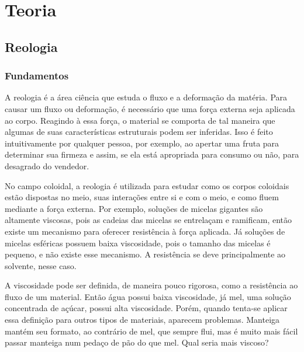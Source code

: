 \part{Teoria}
	\chapter{Reologia}
		\section{Fundamentos}
		
		A reologia é a área ciência que estuda o fluxo e a deformação da matéria. Para causar um fluxo ou deformação, é necessário que uma força externa seja aplicada ao corpo. Reagindo à essa força, o material se comporta de tal maneira que algumas de suas características estruturais podem ser inferidas. Isso é feito intuitivamente por qualquer pessoa, por exemplo, ao apertar uma fruta para determinar sua firmeza e assim, se ela está apropriada para consumo ou não, para desagrado do vendedor.  %
		
		No campo coloidal, a reologia é utilizada para estudar como os corpos coloidais estão dispostas no meio, suas interações entre si e com o meio, e como fluem mediante a força externa. Por exemplo, soluções de micelas gigantes são altamente viscosas, pois as cadeias das micelas se entrelaçam e ramificam, então existe um mecanismo para oferecer resistência à força aplicada. Já soluções de micelas esféricas possuem baixa viscosidade, pois o tamanho das micelas é pequeno, e não existe esse mecanismo. A resistência se deve principalmente ao solvente, nesse caso.
		
		A viscosidade pode ser definida, de maneira pouco rigorosa, como a resistência ao fluxo de um material. Então água possui baixa viscosidade, já mel, uma solução concentrada de açúcar, possui alta viscosidade. Porém, quando tenta-se aplicar essa definição para outros tipos de materiais, aparecem problemas. Manteiga mantém seu formato, ao contrário de mel, que sempre flui, mas é muito mais fácil passar manteiga num pedaço de pão do que mel. Qual seria mais viscoso? %
		
